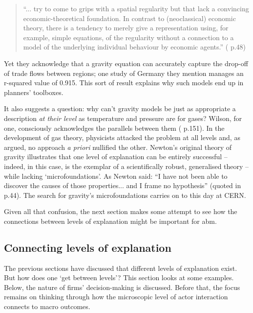 \begin{quote}
``... try to come to grips with a spatial regularity but that lack a convincing economic-theoretical foundation. In contrast to (neoclassical) economic theory, there is a tendency to merely give a representation using, for example, simple equations, of the regularity without a connection to a model of the underlying individual behaviour by economic agents.'' (\citealt{brakman_new_2009}  p.48)
\end{quote}

Yet they acknowledge that a gravity equation can accurately capture the drop-off of trade flows between regions; one study of Germany they mention manages an r-squared value of 0.915. This sort of result explains why such models end up in planners' toolboxes. 

 It also suggests a question: why can't gravity models be just as appropriate a description \emph{at their level} as temperature and pressure are for gases? Wilson, for one, consciously acknowledges the parallels between them (\citealt{wilson_complex_2000} p.151). In the development of gas theory, physicists attacked the problem at all levels and, as argued, no approach \emph{a priori} nullified the other. Newton's original theory of gravity illustrates that one level of explanation can be entirely successful – indeed, in this case, is the exemplar of a scientifically robust, generalised theory – while lacking `microfoundations'. As Newton said: ``I have not been able to discover the causes of those properties... and I frame no hypothesis'' (quoted in \citealt{silver_ascent_2000} p.44). The search for gravity's microfoundations carries on to this day at CERN.

Given all that confusion, the next section makes some attempt to see how the connections between levels of explanation might be important for \gls{abm}.

\subsection{Connecting levels of explanation \label{sec:connecting}}

The previous sections have discussed that different levels of explanation exist. But how does one `get between levels'? This section looks at some examples. Below, the nature of firms' decision-making is discussed. Before that, the focus remains on thinking through how the microscopic level of actor interaction connects to macro outcomes. 

